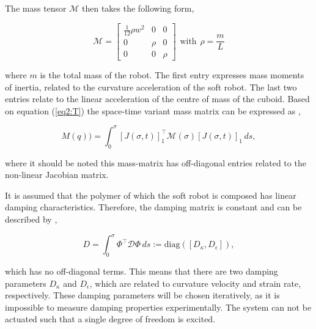 The mass tensor $\mathcal{M}$ then takes the following form,

\begin{equation}
    \mathcal{M} = \begin{bmatrix} \frac{1}{12}\rho w^2 & 0 & 0 \\
                                   0 & \rho & 0 \\
                                   0 & 0 & \rho \end{bmatrix}\hspace{5pt} \text{with} \hspace{5pt} \rho = \frac{m}{L}
\end{equation} 




where $m$ is the total mass of the robot. The first entry expresses mass moments of inertia, related to the curvature acceleration of the soft robot. The last two entries relate to the linear acceleration of the centre of mass of the cuboid. Based on equation (\ref{eq2:T}) the space-time variant mass matrix can be expressed as  \textcolor{blue}{\cite{Caasenbrood2020}}, 


\begin{equation}
    M(q)) = \int_0^{\sigma} [J(\sigma,t)]_1^\top \mathcal{M}(\sigma)[J(\sigma,t)]_1  \hspace{2pt}ds,
\end{equation}

where it should be noted this mass-matrix has off-diagonal entries related to the non-linear Jacobian matrix. 

It is assumed that the polymer of which the soft robot is composed has linear damping characteristics. Therefore, the damping matrix is constant and can be described by  \textcolor{blue}{\cite{Caasenbrood2020}},

\begin{equation}
    D = \int_0^\sigma \Phi^\top \mathcal{D} \Phi \hspace{2pt} ds  := \text{diag}([D_\kappa, D_\epsilon]),
\end{equation}

which has no off-diagonal terms. This means that there are two damping parameters $D_\kappa$ and $D_\epsilon$, which are related to curvature velocity and strain rate, respectively. These damping parameters will be chosen iteratively, as it is impossible to measure damping properties experimentally. The system can not be actuated such that a single degree of freedom is excited. 

